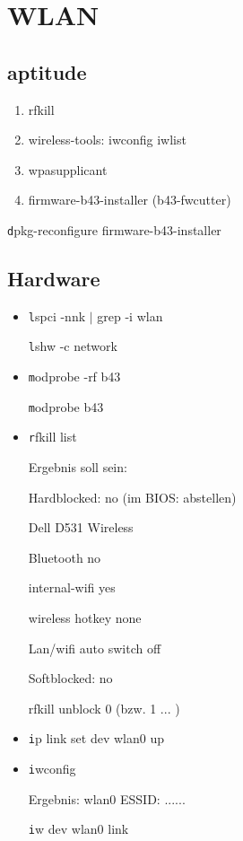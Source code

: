 \section{WLAN}




\subsection{aptitude}
\begin{enumerate}
\item rfkill
\item wireless-tools: iwconfig iwlist
\item wpasupplicant 
\item firmware-b43-installer (b43-fwcutter)
\end{enumerate}

{\texttt dpkg-reconfigure firmware-b43-installer}

\subsection{Hardware}


\begin{itemize}
\item 
{\texttt lspci -nnk $|$ grep -i wlan}

{\texttt lshw -c network}
\item 
{\texttt modprobe -rf b43}

{\texttt modprobe  b43}

\item 
{\texttt rfkill list}

Ergebnis soll sein: 

Hardblocked: no (im BIOS: abstellen)

Dell D531 Wireless 

Bluetooth no

internal-wifi yes

wireless hotkey none

Lan/wifi auto switch off

Softblocked: no

rfkill unblock 0  (bzw. 1 ... )
\item

{\texttt ip link set dev wlan0 up}

\item
{\texttt iwconfig}

Ergebnis: wlan0 ESSID: ......


{\texttt iw dev wlan0 link}

\end{itemize}

